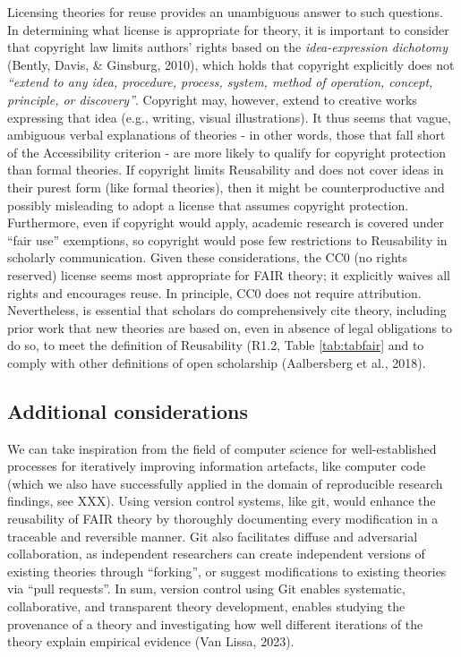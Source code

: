 \documentclass[
  man,floatsintext]{apa6}
\begin{document}
Licensing theories for reuse provides an unambiguous answer to such questions.
In determining what license is appropriate for theory,
it is important to consider that copyright law limits authors' rights based on the \emph{idea-expression dichotomy} (Bently, Davis, \& Ginsburg, 2010),
which holds that copyright explicitly does not
\emph{``extend to any idea, procedure, process, system, method of operation, concept, principle, or discovery''}.
Copyright may, however, extend to creative works expressing that idea (e.g., writing, visual illustrations).
It thus seems that vague, ambiguous verbal explanations of theories - in other words, those that fall short of the Accessibility criterion - are more likely to qualify for copyright protection than formal theories.
If copyright limits Reusability and does not cover ideas in their purest form (like formal theories),
then it might be counterproductive and possibly misleading to adopt a license that assumes copyright protection.
Furthermore, even if copyright would apply, academic research is covered under ``fair use'' exemptions,
so copyright would pose few restrictions to Reusability in scholarly communication.
Given these considerations, the CC0 (no rights reserved) license seems most appropriate for FAIR theory;
it explicitly waives all rights and encourages reuse.
In principle, CC0 does not require attribution.
Nevertheless, is essential that scholars do comprehensively cite theory,
including prior work that new theories are based on,
even in absence of legal obligations to do so,
to meet the definition of Reusability (R1.2, Table \ref{tab:tabfair} and to comply with other definitions of open scholarship (Aalbersberg et al., 2018).

\subsection{Additional considerations}\label{additional-considerations}

We can take inspiration from the field of computer science for well-established processes for iteratively improving information artefacts, like computer code (which we also have successfully applied in the domain of reproducible research findings, see XXX).
Using version control systems, like git, would enhance the reusability of FAIR theory by thoroughly documenting every modification in a traceable and reversible manner.
Git also facilitates diffuse and adversarial collaboration,
as independent researchers can create independent versions of existing theories through ``forking'', or suggest modifications to existing theories via ``pull requests''.
In sum, version control using Git enables systematic, collaborative, and transparent theory development,
enables studying the provenance of a theory and investigating how well different iterations of the theory explain empirical evidence (Van Lissa, 2023).
\end{document}
